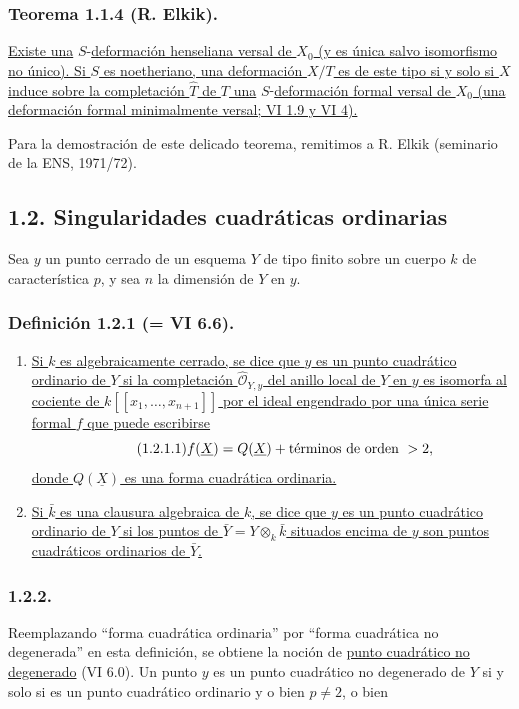 \pageoriginale

\subsubsection*{Teorema 1.1.4 (R. Elkik).}
\underline{Existe una} $S$-\underline{deformación henseliana versal de $X_0$ (y es
única salvo isomorfismo no único). Si $S$ es noetheriano, una
deformación $X/T$ es de este tipo si y solo si $X$ induce sobre la
completación $\widehat T$ de $T$ una} $S$-\underline{deformación formal versal de
$X_0$ (una deformación formal minimalmente versal; VI 1.9 y VI 4).}

Para la demostración de este delicado teorema, remitimos a R. Elkik
(seminario de la ENS, 1971/72).

\subsection*{1.2. Singularidades cuadráticas ordinarias}

Sea $y$ un punto cerrado de un esquema $Y$ de tipo finito sobre un
cuerpo $k$ de característica $p$, y sea $n$ la dimensión de $Y$ en $y$.

\subsubsection*{Definición 1.2.1 (= VI 6.6).}
\begin{enumerate}[label=(\roman*),leftmargin=2.6em]
\item \underline{Si $k$ es algebraicamente cerrado, se dice que $y$ es
un punto cuadrático ordinario de $Y$ si la completación
$\widehat{\mathcal O}_{Y,y}$ del anillo local de $Y$ en $y$ es isomorfa
al cociente de $k[[x_1,\ldots,x_{n+1}]]$ por el ideal engendrado por una
única serie formal $f$ que puede escribirse}
\begin{equation}\tag{\sisi{4.2.1}{1.2.1.1}}
f(\underline X)=Q(\underline X)\sisi{=}{+}
\text{términos de orden }>2,
\end{equation}
\underline{donde $Q(\underline X)$ es una forma cuadrática ordinaria.}

\item \underline{Si $\bar k$ es una clausura algebraica de $k$, se dice
que $y$ es un punto cuadrático ordinario de $Y$ si los puntos de
$\bar Y=Y\otimes_k\bar k$ situados encima de $y$ son puntos cuadráticos
ordinarios de $\bar Y$.}
\end{enumerate}

\subsubsection*{1.2.2.}
Reemplazando ``forma cuadrática ordinaria'' por ``forma cuadrática no
degenerada'' en esta definición, se obtiene la noción de
\underline{punto cuadrático no degenerado} (VI 6.0). Un punto $y$ es un
punto cuadrático no degenerado de $Y$ si y solo si es un punto
cuadrático ordinario y o bien $p\ne2$, o bien

